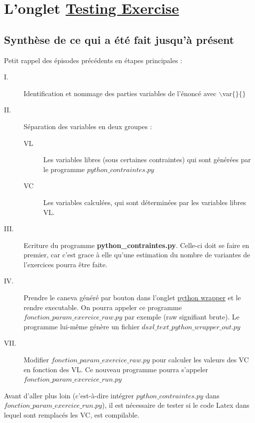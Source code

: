 {\begin{remarque}
\end{remarque}


\section{L'onglet \underline{Testing Exercise}}

\subsection{Synthèse de ce qui a été fait jusqu'à présent}

Petit rappel des épisodes précédents en étapes principales : 
\begin{description}
 \item[I. ]Identification et nommage des parties variables de l'énoncé avec $\backslash$var$\{\}\{\}$ 
 \item[II. ] Séparation des variables en deux groupes : 
 \begin{description}
  \item[VL] Les variables libres (sous certaines contraintes) qui sont générées par le programme  {\bf $python\_contraintes.py$}
  \item[VC] Les variables calculées, qui sont déterminées par les variables libres VL.
 \end{description}
 \item[III. ] Ecriture du programme  {\bf python\_contraintes.py}. Celle-ci doit se faire en premier, car c'est grace à elle 
    qu'une estimation du nombre de variantes de l'exercices pourra être faite. 
 \item[IV. ] Prendre le caneva généré par bouton  dans l'onglet \underline{python wrapper} et le rendre executable.
  On pourra appeler ce programme {\bf $fonction\_param\_exercice\_raw.py$} par exemple (raw signifiant brute).
  Le programme lui-même génère un fichier {\bf $dsxl\_text\_python\_wrapper\_out.py$}
 \item[VII. ] Modifier  {\bf $fonction\_param\_exercice\_raw.py$} pour calculer les valeurs des VC en fonction des VL. 
   Ce nouveau programme pourra s'appeler {\bf $fonction\_param\_exercice\_run.py$}
\end{description}

Avant d'aller plus loin (c'est-à-dire intégrer {\bf $python\_contraintes.py$} dans  {\bf $fonction\_param\_exercice\_run.py$}), il est nécessaire de tester si le code 
Latex dans lequel sont remplacés les VC, est compilable. 

}
